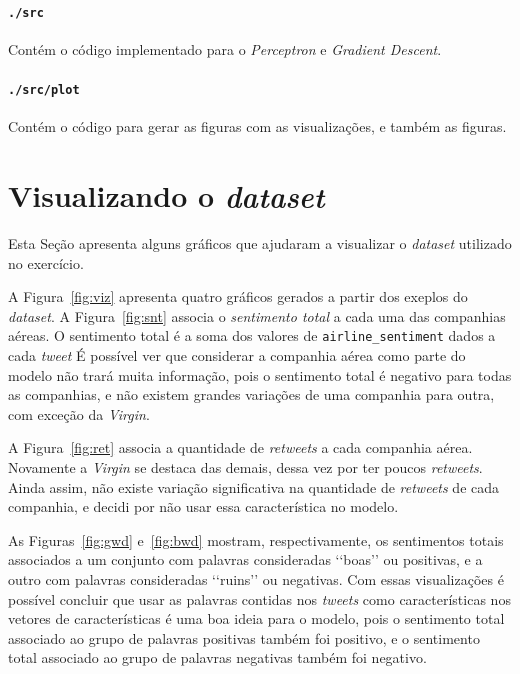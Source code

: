 \documentclass[a4paper, 12pt]{article}
\begin{document}
\paragraph{\texttt{./src}} Contém o código implementado
para o \textit{Perceptron} e \textit{Gradient Descent}.

\paragraph{\texttt{./src/plot}} Contém o código para
gerar as figuras com as visualizações, e também as figuras.

\section{Visualizando o \textit{dataset}} \label{sec:viz}

Esta Seção apresenta alguns gráficos que ajudaram a visualizar
o \textit{dataset} utilizado no exercício.

A Figura~\ref{fig:viz} apresenta quatro gráficos gerados a partir dos exeplos
do \textit{dataset}. A Figura~\ref{fig:snt} associa o \textit{sentimento total}
a cada uma das companhias aéreas.  O sentimento total é a soma dos valores de
\texttt{airline\_sentiment} dados a cada \textit{tweet} É possível ver que
considerar a companhia aérea como parte do modelo não trará muita informação,
pois o sentimento total é negativo para todas as companhias, e não existem
grandes variações de uma companhia para outra, com exceção da \textit{Virgin}.

A Figura~\ref{fig:ret} associa a quantidade de \textit{retweets}
a cada companhia aérea. Novamente a \textit{Virgin} se destaca
das demais, dessa vez por ter poucos \textit{retweets}. Ainda assim,
não existe variação significativa na quantidade de \textit{retweets}
de cada companhia, e decidi por não usar essa característica no modelo.

As Figuras~\ref{fig:gwd} e~\ref{fig:bwd} mostram, respectivamente, os
sentimentos totais associados a um conjunto com palavras consideradas
\lq{}\lq{}boas\rq{}\rq{} ou positivas, e a outro com palavras consideradas
\lq{}\lq{}ruins\rq{}\rq{} ou negativas. Com essas visualizações é possível
concluir que usar as palavras contidas nos \textit{tweets} como características
nos vetores de características é uma boa ideia para o modelo, pois o sentimento
total associado ao grupo de palavras positivas também foi positivo, e o
sentimento total associado ao grupo de palavras negativas também foi negativo.
\end{document}
